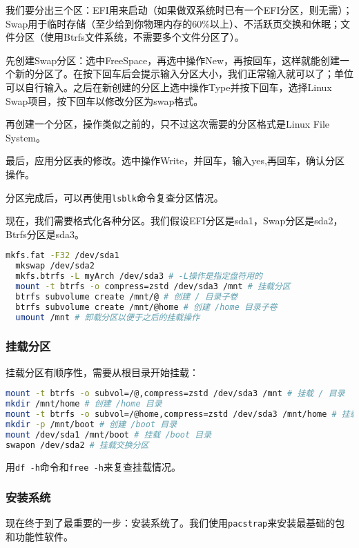 \documentclass[../main.tex]{subfiles}
\begin{document}
我们要分出三个区：EFI用来启动（如果做双系统时已有一个EFI分区，则无需）；Swap用于临时存储（至少给到你物理内存的60\%以上）、不活跃页交换和休眠；文件分区（使用Btrfs文件系统，不需要多个文件分区了）。

先创建Swap分区：选中FreeSpace，再选中操作New，再按回车，这样就能创建一个新的分区了。在按下回车后会提示输入分区大小，我们正常输入就可以了；单位可以自行输入。之后在新创建的分区上选中操作Type并按下回车，选择Linux Swap项目，按下回车以修改分区为swap格式。

再创建一个分区，操作类似之前的，只不过这次需要的分区格式是Linux File System。

最后，应用分区表的修改。选中操作Write，并回车，输入yes,再回车，确认分区操作。

分区完成后，可以再使用\texttt{lsblk}命令复查分区情况。

现在，我们需要格式化各种分区。我们假设EFI分区是sda1，Swap分区是sda2，Btrfs分区是sda3。

\begin{lstlisting}[language=bash]
  mkfs.fat -F32 /dev/sda1
  mkswap /dev/sda2
  mkfs.btrfs -L myArch /dev/sda3 # -L操作是指定盘符用的
  mount -t btrfs -o compress=zstd /dev/sda3 /mnt # 挂载分区
  btrfs subvolume create /mnt/@ # 创建 / 目录子卷
  btrfs subvolume create /mnt/@home # 创建 /home 目录子卷
  umount /mnt # 卸载分区以便于之后的挂载操作
\end{lstlisting}

\subsubsection{挂载分区}

挂载分区有顺序性，需要从根目录开始挂载：

\begin{lstlisting}[language=bash]
mount -t btrfs -o subvol=/@,compress=zstd /dev/sda3 /mnt # 挂载 / 目录
mkdir /mnt/home # 创建 /home 目录
mount -t btrfs -o subvol=/@home,compress=zstd /dev/sda3 /mnt/home # 挂载 /home 目录
mkdir -p /mnt/boot # 创建 /boot 目录
mount /dev/sda1 /mnt/boot # 挂载 /boot 目录
swapon /dev/sda2 # 挂载交换分区
\end{lstlisting}

用\texttt{df -h}命令和\texttt{free -h}来复查挂载情况。

\subsubsection{安装系统}

现在终于到了最重要的一步：安装系统了。我们使用\texttt{pacstrap}来安装最基础的包和功能性软件。
\end{document}
